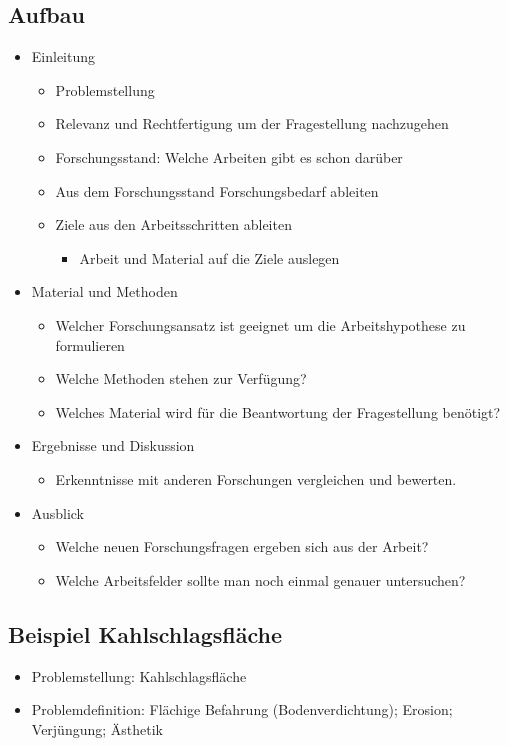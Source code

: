 \documentclass[12pt]{article}
\begin{document}
\subsection*{Aufbau}
\begin{itemize}
 \item Einleitung
\begin{itemize}
 \item Problemstellung
\item Relevanz und Rechtfertigung um der Fragestellung nachzugehen
\item Forschungsstand: Welche Arbeiten gibt es schon darüber
\item Aus dem Forschungsstand Forschungsbedarf ableiten
\item Ziele aus den Arbeitsschritten ableiten
\begin{itemize}
 \item Arbeit und Material auf die Ziele auslegen
\end{itemize}
\end{itemize}
\item Material und Methoden
\begin{itemize}
 \item Welcher Forschungsansatz ist geeignet um die Arbeitshypothese zu formulieren
\item Welche Methoden stehen zur Verfügung?
\item Welches Material wird für die Beantwortung der Fragestellung benötigt?
\end{itemize}
\item Ergebnisse und Diskussion
\begin{itemize}
 \item Erkenntnisse mit anderen Forschungen vergleichen und bewerten.
\end{itemize}
\item Ausblick
\begin{itemize}
 \item Welche neuen Forschungsfragen ergeben sich aus der Arbeit?
\item Welche Arbeitsfelder sollte man noch einmal genauer untersuchen?
\end{itemize}
\end{itemize}

\subsection*{Beispiel Kahlschlagsfläche}
\begin{itemize}
 \item Problemstellung: Kahlschlagsfläche
 \item Problemdefinition: Flächige Befahrung (Bodenverdichtung); Erosion; Verjüngung; Ästhetik
\end{itemize}
\end{document}

